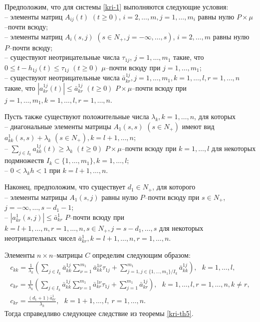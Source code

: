 Предположим, что для системы \eqref{kri-1} выполняются следующие условия:\\
\noindent
  -- элементы матриц
$A_{ij}(t) \,\, (t \geq 0)$, $i = 2,\dots,m, j = 1,\dots,m_i$ равны нулю
$P\times \mu$--почти всюду;\\
  -- элементы матриц $A_i(s,j)\,\, (s \in
N_+, j=-\infty,\dots,s)$, $i=2,\dots,m$  равны нулю $P$--почти всюду;\\
    --  существуют неотрицательные числа $\tau_{1j}$, $j = 1,\dots,m_1$ такие, что $0 \leq t- h_{1j}(t) \leq \tau _{1j} {\,} {\,} (t
\geq 0)$ $\mu $--почти всюду при $j = 1,\dots,m_1$;\\
  -- существуют неотрицательные числа $\bar a^{1j}_{kr}, j = 1,\dots,m_1, k =1,\dots,l, r = 1,\dots,n$
 такие, что $|a^{1j}_{kr}(t)|\leq \bar a^{1j}_{kr} \,\, (t\geq 0) $
$P\times\mu$--почти всюду при $j = 1,\dots,m_1, k =1,\dots,l, r =
1,\dots,n$.

Пусть также существуют положительные числа $\lambda _k, k = 1, \dots,
n$, для которых\\
\noindent
-- диагональные элементы
матрицы $ A_1(s,s)$ $(s \in N_+)$ имеют вид $a_{kk}^{1}(s,s) +
\lambda _k \,\, (s \in N_+), k=l + 1, \dots, n$;\\
--  $\sum \limits_{j\in I_k}a^{1j}_{kk}(t)
\geq \lambda _k \,\, (t\geq 0)$ $P\times\mu$--почти всюду при $k =
1,\dots,l$ для некоторых подмножеств $I_k \subset \{1,\dots, m_1\}, k =
1,\dots, l$;\\
-- $0 < \lambda _kh < 1$ при $ k
= l + 1, \dots, n$.

Наконец, предположим, что существует $d_1 \in N_+$, для которого\\
\noindent
  -- элементы матрицы $A_1(s,j)$ равны нулю $P$--почти всюду
при $ s \in N_+$, $j=-\infty,\dots,s-d_1-1$;\\
--
$|a^1_{kr}(s,j)| \leq \bar a^1_{kr}$ $P$--почти всюду при $ k = l+1,
\dots, n, r = 1,\dots,n, s\in N_+, j=s-d_1,\dots,s $ для некоторых
неотрицательных чисел $\bar a^1_{kr},k = l+1, \dots, n, r = 1,\dots,n$.

Элементы $n\times n$--матрицы $C$ определим следующим образом:
$$
\begin{array}{crl}
c_{kk} = \frac{1}{\lambda _k }\left(\sum \limits_{j \in I_k}\bar
a^{1j}_{kk}\sum \limits_{\nu=1}^{m_1}\bar a^{1\nu}_{kk} \tau _{1j} +
\sum \limits_{j=1, j \in \{1,\dots,m_1\}/ I_k}^{m_1} \bar
a^{1j}_{kk}\right), \ \ \ k = 1,\dots,l,\\
c_{kr} = \frac{1}{\lambda _k }\left(\sum \limits_{j \in I_k}\bar
a^{1j}_{kk}\sum \limits_{\nu=1}^{m_1}\bar a^{1\nu}_{kr}\tau _{1j} +
\sum \limits_{j=1}^{m_1} \bar a^{1j}_{kr}\right),\ \ \ k =
1,\dots,l,r = 1, \dots, n, k \neq r,\\
 c_{kr} = \frac{(d_1+1)\bar a^{1}_{kr}}{\lambda_k}, \ \ \ k = 1 + 1,\dots,l, \
 r = 1,\dots,n.
\end{array}
$$
Тогда справедливо следующее следствие из теоремы \ref{kri-th5}.

